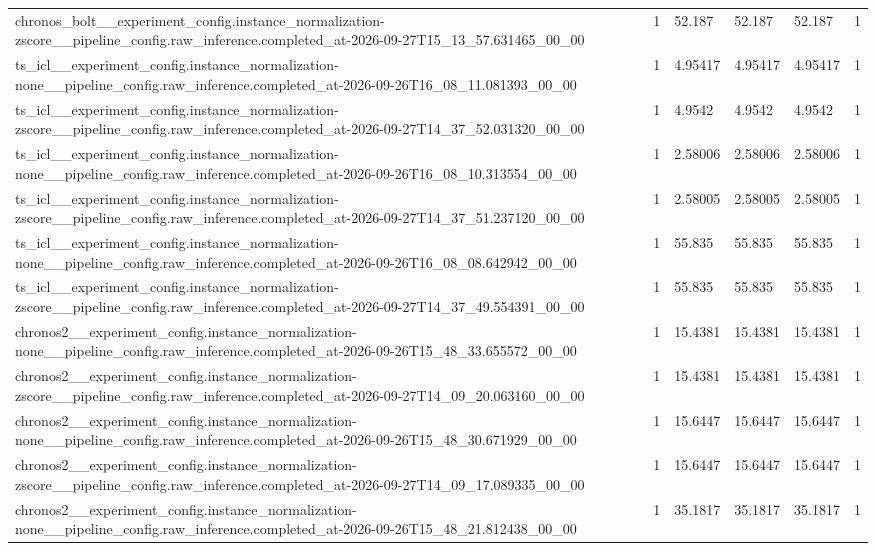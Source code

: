 \begin{tabular}{llllll}
chronos\_bolt\_\_experiment\_config.instance\_normalization-zscore\_\_pipeline\_config.raw\_inference.completed\_at-2026-09-27T15\_13\_57.631465\_00\_00 & 1 & 52.187 & 52.187 & 52.187 & 1 \\
ts\_icl\_\_experiment\_config.instance\_normalization-none\_\_pipeline\_config.raw\_inference.completed\_at-2026-09-26T16\_08\_11.081393\_00\_00 & 1 & 4.95417 & 4.95417 & 4.95417 & 1 \\
ts\_icl\_\_experiment\_config.instance\_normalization-zscore\_\_pipeline\_config.raw\_inference.completed\_at-2026-09-27T14\_37\_52.031320\_00\_00 & 1 & 4.9542 & 4.9542 & 4.9542 & 1 \\
ts\_icl\_\_experiment\_config.instance\_normalization-none\_\_pipeline\_config.raw\_inference.completed\_at-2026-09-26T16\_08\_10.313554\_00\_00 & 1 & 2.58006 & 2.58006 & 2.58006 & 1 \\
ts\_icl\_\_experiment\_config.instance\_normalization-zscore\_\_pipeline\_config.raw\_inference.completed\_at-2026-09-27T14\_37\_51.237120\_00\_00 & 1 & 2.58005 & 2.58005 & 2.58005 & 1 \\
ts\_icl\_\_experiment\_config.instance\_normalization-none\_\_pipeline\_config.raw\_inference.completed\_at-2026-09-26T16\_08\_08.642942\_00\_00 & 1 & 55.835 & 55.835 & 55.835 & 1 \\
ts\_icl\_\_experiment\_config.instance\_normalization-zscore\_\_pipeline\_config.raw\_inference.completed\_at-2026-09-27T14\_37\_49.554391\_00\_00 & 1 & 55.835 & 55.835 & 55.835 & 1 \\
chronos2\_\_experiment\_config.instance\_normalization-none\_\_pipeline\_config.raw\_inference.completed\_at-2026-09-26T15\_48\_33.655572\_00\_00 & 1 & 15.4381 & 15.4381 & 15.4381 & 1 \\
chronos2\_\_experiment\_config.instance\_normalization-zscore\_\_pipeline\_config.raw\_inference.completed\_at-2026-09-27T14\_09\_20.063160\_00\_00 & 1 & 15.4381 & 15.4381 & 15.4381 & 1 \\
chronos2\_\_experiment\_config.instance\_normalization-none\_\_pipeline\_config.raw\_inference.completed\_at-2026-09-26T15\_48\_30.671929\_00\_00 & 1 & 15.6447 & 15.6447 & 15.6447 & 1 \\
chronos2\_\_experiment\_config.instance\_normalization-zscore\_\_pipeline\_config.raw\_inference.completed\_at-2026-09-27T14\_09\_17.089335\_00\_00 & 1 & 15.6447 & 15.6447 & 15.6447 & 1 \\
chronos2\_\_experiment\_config.instance\_normalization-none\_\_pipeline\_config.raw\_inference.completed\_at-2026-09-26T15\_48\_21.812438\_00\_00 & 1 & 35.1817 & 35.1817 & 35.1817 & 1 \\

\end{tabular}
